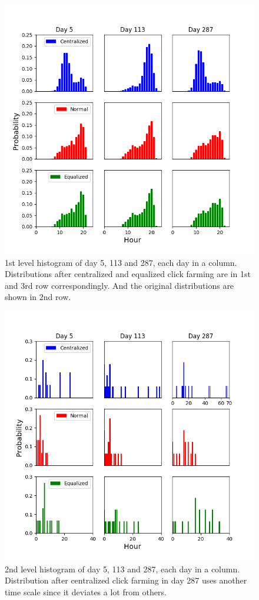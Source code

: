 \documentclass[10pt,conference,letterpaper]{IEEEtran}
\begin{document}
			\begin{figure}[!t]
				\centering
				\includegraphics[width=\linewidth]{fig/Raw1stLevelHist.png}
				\caption{1st level histogram of day 5, 113 and 287, each day in a column. Distributions after centralized and equalized click farming are in 1st and 3rd row correspondingly. And the original distributions are shown in 2nd row.}
				\label{fig:raw-hist-1st}
			\end{figure}
			
			\begin{figure}[!t]
				\centering
				\includegraphics[width=\linewidth]{fig/Raw2ndLevelHist}
				\caption{2nd level histogram of day 5, 113 and 287, each day in a column. Distribution after centralized click farming in day 287 uses another time scale since it deviates a lot from others.}
				\label{fig:raw-hist-2nd}
			\end{figure}
	
\end{document}
